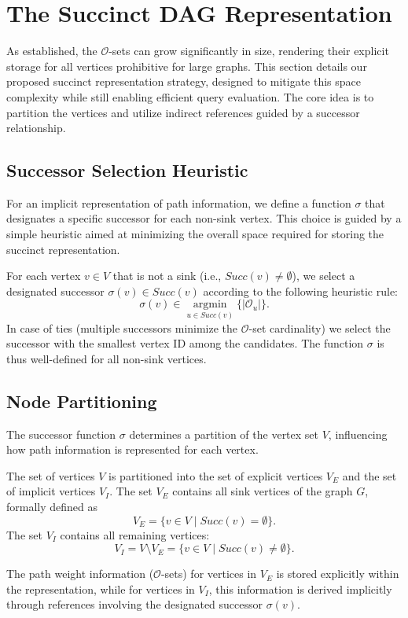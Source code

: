 \section{The Succinct DAG Representation}
\label{sec:succinct_dag_representation}

As established, the $\mathcal{O}$-sets can grow significantly in size, rendering their explicit storage for all vertices prohibitive for large graphs. This section details our proposed succinct representation strategy, designed to mitigate this space complexity while still enabling efficient query evaluation. The core idea is to partition the vertices and utilize indirect references guided by a successor relationship.

\subsection*{Successor Selection Heuristic}
\label{subsec:successor_selection}

For an implicit representation of path information, we define a function $\sigma$ that designates a specific successor for each non-sink vertex. This choice is guided by a simple heuristic aimed at minimizing the overall space required for storing the succinct representation.

\begin{definition}
    \label{def:sigma_function}
    For each vertex $v \in V$ that is not a sink (i.e., $Succ(v) \neq \emptyset$), we select a designated successor $\sigma(v) \in Succ(v)$ according to the following heuristic rule:
    \[ \sigma(v) \in \underset{u \in Succ(v)}{\operatorname{argmin}} \{ |\mathcal{O}_u| \}. \]
    In case of ties (multiple successors minimize the $\mathcal{O}$-set cardinality) we select the successor with the smallest vertex ID among the candidates. The function $\sigma$ is thus well-defined for all non-sink vertices.
\end{definition}

\subsection*{Node Partitioning}
\label{subsec:node_partitioning}

The successor function $\sigma$ determines a partition of the vertex set $V$, influencing how path information is represented for each vertex.

\begin{definition}
    \label{def:explicit_implicit}
    The set of vertices $V$ is partitioned into the set of explicit vertices $V_E$ and the set of implicit vertices $V_I$. The set $V_E$ contains all sink vertices of the graph $G$, formally defined as
    \[ V_E = \{ v \in V \mid Succ(v) = \emptyset \}. \]
    The set $V_I$ contains all remaining vertices:
    \[ V_I = V \setminus V_E = \{ v \in V \mid Succ(v) \neq \emptyset \}. \]
\end{definition}
The path weight information ($\mathcal{O}$-sets) for vertices in $V_E$ is stored explicitly within the representation, while for vertices in $V_I$, this information is derived implicitly through references involving the designated successor $\sigma(v)$.

